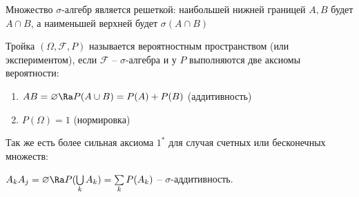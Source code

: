 Множество $\sigma$-алгебр является решеткой: наибольшей нижней границей $A, B$ будет $A \cap B$, а наименьшей верхней будет $\sigma(A \cap B)$

\begin{Def}
    Тройка $(\Omega, \mathcal{F}, P)$ называется вероятностным пространством (или экспериментом), если $\mathcal{F}$ -- $\sigma$-алгебра и у $P$ выполняются две аксиомы вероятности:
    \begin{enumerate}
        \item $AB = \varnothing \Ra P(A \cup B) = P(A) + P(B)$ (аддитивность)
        \item $P(\Omega) = 1$ (нормировка)
    \end{enumerate}
\end{Def}
Так же есть более сильная аксиома $1^*$ для случая счетных или бесконечных множеств:

$A_kA_j = \varnothing \Ra P(\bigcup\limits_k A_k) = \sum\limits_k P(A_k)$ -- $\sigma$-аддитивность.

